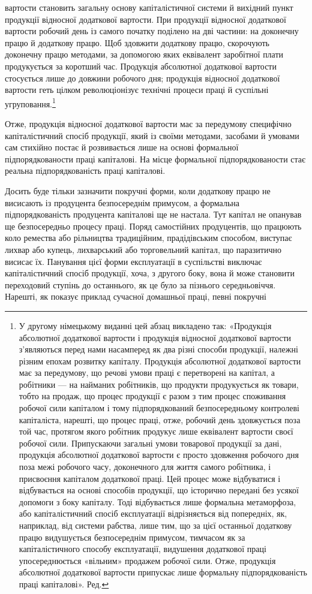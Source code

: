 вартости становить загальну основу капіталістичної системи
й вихідний пункт продукції відносної додаткової вартости. При
продукції відносної додаткової вартости робочий день із самого
початку поділено на дві частини: на доконечну працю й додаткову
працю. Щоб здовжити додаткову працю, скорочують доконечну
працю методами, за допомогою яких еквівалент заробітної
плати продукується за коротший час. Продукція абсолютної
додаткової вартости стосується лише до довжини робочого дня;
продукція відносної додаткової вартости геть цілком революціонізує
технічні процеси праці й суспільні угруповання.\footnote*{
У другому німецькому виданні цей абзац викладено так: «Продукція
абсолютної додаткової вартости і продукція відносної додаткової
вартости з’являються перед нами насамперед як два різні способи продукції,
належні різним епохам розвитку капіталу. Продукція абсолютної
додаткової вартости має за передумову, що речові умови праці є перетворені
на капітал, а робітники — на найманих робітників, що продукти
продукується як товари, тобто на продаж, що процес продукції є разом
з тим процес споживання робочої сили капіталом і тому підпорядкований
безпосередньому контролеві капіталіста, нарешті, що процес праці, отже,
робочий день здовжується поза той час, протягом якого робітник продукує
лише еквівалент вартости своєї робочої сили. Припускаючи загальні
умови товарової продукції за дані, продукція абсолютної додаткової вартости
є просто здовження робочого дня поза межі робочого часу, доконечного
для життя самого робітника, і присвоєння капіталом додаткової
праці. Цей процес може відбуватися і відбувається на основі способів
продукції, що історично передані без усякої допомоги з боку капіталу.
Тоді відбувається лише формальна метаморфоза, або капіталістичний
спосіб експлуатації відрізняється від попередніх, як, наприклад, від
системи рабства, лише тим, що за цієї останньої додаткову працю видушується
безпосереднім примусом, тимчасом як за капіталістичного способу
експлуатації, видушення додаткової праці упосереднюється «вільним»
продажем робочої сили. Отже, продукція абсолютної додаткової
вартости припускає лише формальну підпорядкованість праці капіталові». Ред.
}

Отже, продукція відносної додаткової вартости має за передумову
специфічно капіталістичний спосіб продукції, який із
своїми методами, засобами й умовами сам стихійно постає й розвивається
лише на основі формальної підпорядкованости праці
капіталові. На місце формальної підпорядкованости стає реальна
підпорядкованість праці капіталові.

Досить буде тільки зазначити покручні форми, коли додаткову
працю не висисають із продуцента безпосереднім примусом,
а формальна підпорядкованість продуцента капіталові ще не настала.
Тут капітал не опанував ще безпосередньо процесу праці.
Поряд самостійних продуцентів, що працюють коло ремества
або рільництва традиційним, прадідівським способом, виступає
лихвар або купець, лихварський або торговельний капітал, що
паразитично висисає їх. Панування цієї форми експлуатації в
суспільстві виключає капіталістичний спосіб продукції, хоча,
з другого боку, вона й може становити переходовий ступінь до
останнього, як це було за пізнього середньовіччя. Нарешті, як
показує приклад сучасної домашньої праці, певні покручні